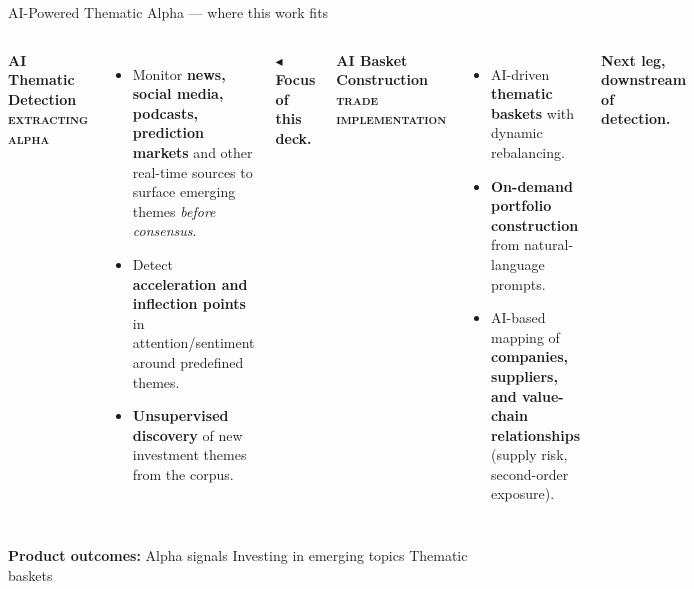 \documentclass[10pt,aspectratio=169]{beamer}
\newcommand{\panelheader}[3]{%
  \begin{tcolorbox}[
      enhanced, colback=#1, colframe=#1,
      boxrule=0pt, arc=2pt, left=10pt, right=10pt, top=6pt, bottom=6pt,
      sharp corners=southwest]
    {\color{white}\bfseries\large #2}\\[0.05cm]
    {\color{corporange}\scriptsize\bfseries\textsc{#3}}
  \end{tcolorbox}}
\begin{document}
\begin{frame}{AI-Powered Thematic Alpha --- where this work fits}
  \footnotesize

  \begin{columns}[T,onlytextwidth]
      \panelheader{corpblue}{AI Thematic Detection}{extracting alpha}
      \vspace{0.10cm}
      \begin{itemize}\setlength\itemsep{0.10cm}
        \item Monitor \textbf{news, social media, podcasts,
              prediction markets} and other real-time sources
              to surface emerging themes \emph{before consensus}.
        \item Detect \textbf{acceleration and inflection points}
              in attention/sentiment around predefined themes.
        \item \textbf{Unsupervised discovery} of new investment themes
              from the corpus.
      \end{itemize}
      \vspace{0.10cm}
      \textbf{\textcolor{corpblue}{$\blacktriangleleft$ Focus of this deck.}}

      \panelheader{corpgreen}{AI Basket Construction}{trade implementation}
      \vspace{0.10cm}
      \begin{itemize}\setlength\itemsep{0.10cm}
        \item AI-driven \textbf{thematic baskets} with dynamic
              rebalancing.
        \item \textbf{On-demand portfolio construction} from
              natural-language prompts.
        \item AI-based mapping of \textbf{companies, suppliers, and
              value-chain relationships} (supply risk, second-order
              exposure).
      \end{itemize}
      \vspace{0.10cm}
      \textbf{\textcolor{corpgreen}{Next leg, downstream of detection.}}
  \end{columns}

  \vspace{0.20cm}
  \begin{tcolorbox}[colback=corplight, colframe=corplight,
                    boxrule=0pt, arc=2pt, left=8pt, right=8pt, top=4pt, bottom=4pt]
    \footnotesize
    \textbf{Product outcomes:}\;
    Alpha signals \quad\textbullet\quad
    Investing in emerging topics \quad\textbullet\quad
    Thematic baskets
  \end{tcolorbox}

\end{frame}
\end{document}
